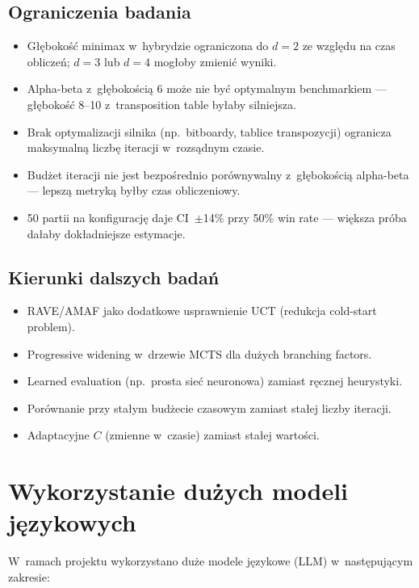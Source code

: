 \documentclass[12pt,a4paper]{article}
\begin{document}
\subsection{Ograniczenia badania}
\begin{itemize}[nosep]
  \item Głębokość minimax w~hybrydzie ograniczona do $d=2$ ze względu na czas obliczeń; $d=3$ lub $d=4$ mogłoby zmienić wyniki.
  \item Alpha-beta z~głębokością 6 może nie być optymalnym benchmarkiem — głębokość 8--10 z~transposition table byłaby silniejsza.
  \item Brak optymalizacji silnika (np.\ bitboardy, tablice transpozycji) ogranicza maksymalną liczbę iteracji w~rozsądnym czasie.
  \item Budżet iteracji nie jest bezpośrednio porównywalny z~głębokością alpha-beta — lepszą metryką byłby czas obliczeniowy.
  \item 50 partii na konfigurację daje CI~$\pm$14\% przy 50\% win rate — większa próba dałaby dokładniejsze estymacje.
\end{itemize}

\subsection{Kierunki dalszych badań}
\begin{itemize}[nosep]
  \item RAVE/AMAF jako dodatkowe usprawnienie UCT (redukcja cold-start problem).
  \item Progressive widening w~drzewie MCTS dla dużych branching factors.
  \item Learned evaluation (np.\ prosta sieć neuronowa) zamiast ręcznej heurystyki.
  \item Porównanie przy stałym budżecie czasowym zamiast stałej liczby iteracji.
  \item Adaptacyjne $C$ (zmienne w~czasie) zamiast stałej wartości.
\end{itemize}

\section{Wykorzystanie dużych modeli językowych}
\label{sec:llm}

W~ramach projektu wykorzystano duże modele językowe (LLM) w~następującym zakresie:
\end{document}
